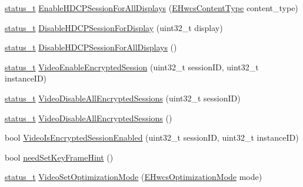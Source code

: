 \begin{DoxyCompactItemize}
\item 
\mbox{\hyperlink{hwcserviceapi_8h_a3806fb2027d9a316d8ca8d9b8b8eb96f}{status\+\_\+t}} \mbox{\hyperlink{classandroid_1_1HwcService_1_1Controls_ae703b526fe5b7a155afba4ff1b476a29}{Enable\+H\+D\+C\+P\+Session\+For\+All\+Displays}} (\mbox{\hyperlink{hwcserviceapi_8h_a69e9b3a54e4c8e504845398c66eab655}{E\+Hwcs\+Content\+Type}} content\+\_\+type)
\item 
\mbox{\hyperlink{hwcserviceapi_8h_a3806fb2027d9a316d8ca8d9b8b8eb96f}{status\+\_\+t}} \mbox{\hyperlink{classandroid_1_1HwcService_1_1Controls_a7dcb46dcf375714e13431a237b82374f}{Disable\+H\+D\+C\+P\+Session\+For\+Display}} (uint32\+\_\+t display)
\item 
\mbox{\hyperlink{hwcserviceapi_8h_a3806fb2027d9a316d8ca8d9b8b8eb96f}{status\+\_\+t}} \mbox{\hyperlink{classandroid_1_1HwcService_1_1Controls_aefda1ddf238e363f7b3fbae760f9658d}{Disable\+H\+D\+C\+P\+Session\+For\+All\+Displays}} ()
\item 
\mbox{\hyperlink{hwcserviceapi_8h_a3806fb2027d9a316d8ca8d9b8b8eb96f}{status\+\_\+t}} \mbox{\hyperlink{classandroid_1_1HwcService_1_1Controls_a17836d295dcf16b98ee2471d52a21d3f}{Video\+Enable\+Encrypted\+Session}} (uint32\+\_\+t session\+ID, uint32\+\_\+t instance\+ID)
\item 
\mbox{\hyperlink{hwcserviceapi_8h_a3806fb2027d9a316d8ca8d9b8b8eb96f}{status\+\_\+t}} \mbox{\hyperlink{classandroid_1_1HwcService_1_1Controls_a199821eab8be184fbc910305da592ff0}{Video\+Disable\+All\+Encrypted\+Sessions}} (uint32\+\_\+t session\+ID)
\item 
\mbox{\hyperlink{hwcserviceapi_8h_a3806fb2027d9a316d8ca8d9b8b8eb96f}{status\+\_\+t}} \mbox{\hyperlink{classandroid_1_1HwcService_1_1Controls_ae4da8d03acf7eb18dfd91b41cfc55887}{Video\+Disable\+All\+Encrypted\+Sessions}} ()
\item 
bool \mbox{\hyperlink{classandroid_1_1HwcService_1_1Controls_a6e1af9c9130f6850c2e1a89df4a15158}{Video\+Is\+Encrypted\+Session\+Enabled}} (uint32\+\_\+t session\+ID, uint32\+\_\+t instance\+ID)
\item 
bool \mbox{\hyperlink{classandroid_1_1HwcService_1_1Controls_a298a713544146bc768127b2f1aaebd7f}{need\+Set\+Key\+Frame\+Hint}} ()
\item 
\mbox{\hyperlink{hwcserviceapi_8h_a3806fb2027d9a316d8ca8d9b8b8eb96f}{status\+\_\+t}} \mbox{\hyperlink{classandroid_1_1HwcService_1_1Controls_a288b633b5e5e29d4778bcc4bff7e346b}{Video\+Set\+Optimization\+Mode}} (\mbox{\hyperlink{hwcserviceapi_8h_a73044de23b8f474352d6753e21fca06d}{E\+Hwcs\+Optimization\+Mode}} mode)

\end{DoxyCompactItemize}
